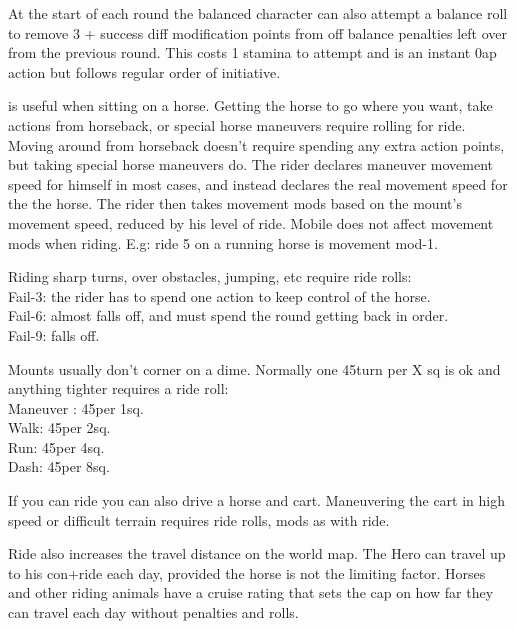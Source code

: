 At the start of each round the balanced character can also attempt a balance roll to remove 3 + success diff modification points from off balance penalties left over from the previous round. This costs 1 stamina to attempt and is an instant 0ap action but follows regular order of initiative.


 is useful when sitting on a horse. Getting the horse to go where you want, take actions from horseback, or special horse maneuvers require rolling for ride. Moving around from horseback doesn't require spending any extra action points, but taking special horse maneuvers do. The rider declares maneuver movement speed for himself in most cases, and instead declares the real movement speed for the the horse. The rider then takes movement mods based on the mount's movement speed, reduced by his level of ride. Mobile does not affect movement mods when riding. E.g: ride 5 on a running horse is movement mod-1.

Riding sharp turns, over obstacles, jumping, etc require ride rolls:\\
Fail-3: the rider has to spend one action to keep control of the horse.\\
Fail-6: almost falls off, and must spend the round getting back in order.\\
Fail-9: falls off.

Mounts usually don't corner on a dime. Normally one 45\degrees turn per X sq is ok and anything tighter requires a ride roll:\\
Maneuver : 45\degrees per 1sq.\\
Walk: 45\degrees per 2sq.\\
Run: 45\degrees per 4sq.\\
Dash: 45\degrees per 8sq.


If you can ride you can also drive a horse and cart. Maneuvering the cart in high speed or difficult terrain requires ride rolls, mods as with ride.

Ride also increases the travel distance on the world map. The Hero can travel up to his con+ride each day, provided the horse is not the limiting factor. Horses and other riding animals have a cruise rating that sets the cap on how far they can travel each day without penalties and rolls.


